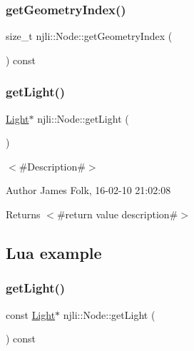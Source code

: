 \subsubsection{\texorpdfstring{get\+Geometry\+Index()}{getGeometryIndex()}}
{\footnotesize\ttfamily size\+\_\+t njli\+::\+Node\+::get\+Geometry\+Index (\begin{DoxyParamCaption}{ }\end{DoxyParamCaption}) const\hspace{0.3cm}{\ttfamily [protected]}}

\mbox{\label{classnjli_1_1_node_a1c75e5abee6e32cb4448dc8e8df8ee7a}} 
\subsubsection{\texorpdfstring{get\+Light()}{getLight()}\hspace{0.1cm}{\footnotesize\ttfamily [1/2]}}
{\footnotesize\ttfamily \mbox{\hyperlink{classnjli_1_1_light}{Light}}$\ast$ njli\+::\+Node\+::get\+Light (\begin{DoxyParamCaption}{ }\end{DoxyParamCaption})}



$<$\#\+Description\#$>$ 

\begin{DoxyAuthor}{Author}
James Folk, 16-\/02-\/10 21\+:02\+:08
\end{DoxyAuthor}
\begin{DoxyReturn}{Returns}
$<$\#return value description\#$>$
\end{DoxyReturn}
\hypertarget{classnjli_1_1_steering_behavior_wander_ex1}{}\subsection{Lua example}\label{classnjli_1_1_steering_behavior_wander_ex1}

\begin{DoxyCodeInclude}
\end{DoxyCodeInclude}
\mbox{\label{classnjli_1_1_node_a1eb4c4b55942621e4a02bf72f964c871}} 
\subsubsection{\texorpdfstring{get\+Light()}{getLight()}\hspace{0.1cm}{\footnotesize\ttfamily [2/2]}}
{\footnotesize\ttfamily const \mbox{\hyperlink{classnjli_1_1_light}{Light}}$\ast$ njli\+::\+Node\+::get\+Light (\begin{DoxyParamCaption}{ }\end{DoxyParamCaption}) const}



